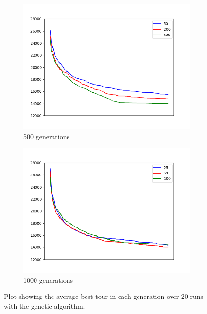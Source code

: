 \documentclass[a4paper]{article}
\begin{document}
\begin{figure}[h]
  \centering
  \begin{subfigure}[b]{0.48\textwidth}
    \includegraphics[width=\textwidth]{run_genetic_24_20_runs_500_gens.png}
    \caption{500 generations}
  \end{subfigure}
  \hfill
  \begin{subfigure}[b]{0.48\textwidth}
    \includegraphics[width=\textwidth]{run_genetic_24_20_runs_1000_gens.png}
    \caption{1000 generations}
  \end{subfigure}
  \caption{Plot showing the average best tour in each generation
    over 20 runs with the genetic algorithm.}
\end{figure}
\end{document}
